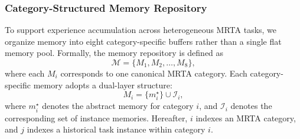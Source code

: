\documentclass[letterpaper,journal]{IEEEtran}
\begin{document}
\subsubsection{Category-Structured Memory Repository}
To support experience accumulation across heterogeneous MRTA tasks, we organize memory into eight category-specific buffers rather than a single flat memory pool. Formally, the memory repository is defined as
\begin{equation}
\mathcal{M} = \{ M_1, M_2, \dots, M_8 \},
\end{equation}
where each \(M_i\) corresponds to one canonical MRTA category. Each category-specific memory adopts a dual-layer structure:
\begin{equation}
M_i = \{ m_i^{\star} \} \cup \mathcal{I}_i,
\end{equation}
where \(m_i^{\star}\) denotes the abstract memory for category \(i\), and \(\mathcal{I}_i\) denotes the corresponding set of instance memories. Hereafter, \(i\) indexes an MRTA category, and \(j\) indexes a historical task instance within category \(i\).
\end{document}
